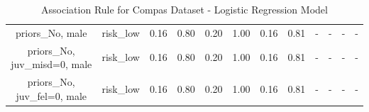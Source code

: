 \begin{table}[H]
{\begin{tabular}{|c|c|c|c|c|c|c|c|c|c|c|c|}
priors\_No, male & risk\_low & 0.16 & 0.80 & 0.20 & 1.00 & 0.16 & 0.81 & - & - & - & - \\
priors\_No, juv\_misd=0, male & risk\_low & 0.16 & 0.80 & 0.20 & 1.00 & 0.16 & 0.81 & - & - & - & - \\
priors\_No, juv\_fel=0, male & risk\_low & 0.16 & 0.80 & 0.20 & 1.00 & 0.16 & 0.81 & - & - & - & - \\
        \hline
        \end{tabular}
        }
        \\[10pt]
        \caption{Association Rule for Compas Dataset - Logistic Regression Model}
        \label{table:asso_rules_compas_Logistic Regression}
        \end{table}
        